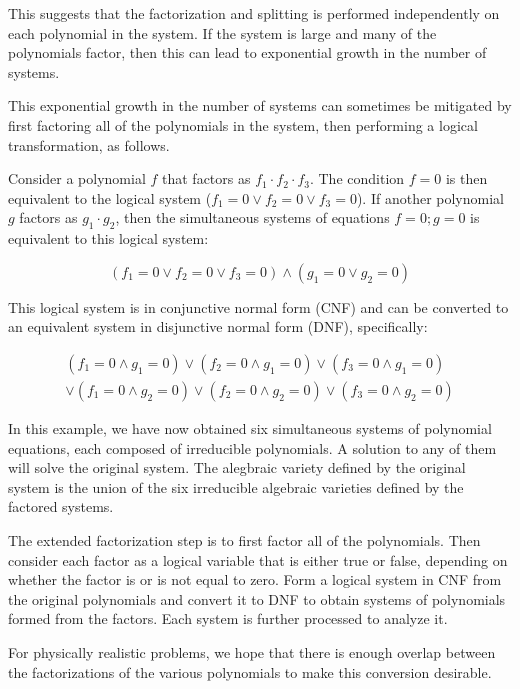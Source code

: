 \documentclass{article}
\begin{document}
This suggests that the factorization and splitting is performed independently on each
polynomial in the system.  If the system is large and many of the polynomials factor,
then this can lead to exponential growth in the number of systems.

This exponential growth in the number of systems can sometimes be mitigated
by first factoring all of the polynomials in the system, then performing
a logical transformation, as follows.

Consider a polynomial $f$ that factors as $f_1\cdot f_2\cdot f_3$.
The condition $f=0$ is then equivalent to the logical system ($f_1=0 \vee f_2=0 \vee f_3=0$).
If another polynomial $g$ factors as $g_1 \cdot g_2$, then the simultaneous
systems of equations $f=0; g=0$ is equivalent to this logical system:

\begin{equation}
(f_1=0 \vee f_2=0 \vee f_3=0) \wedge (g_1 = 0 \vee g_2 = 0)
\end{equation}

This logical system is in conjunctive normal form (CNF) and can be
converted to an equivalent system in disjunctive normal form (DNF), specifically:

\begin{equation}
\begin{split}
(f_1=0 \wedge g_1 = 0) \vee (f_2=0 \wedge g_1 = 0) \vee (f_3=0 \wedge g_1 = 0) \\
\vee (f_1=0 \wedge g_2 = 0) \vee (f_2=0 \wedge g_2 = 0) \vee (f_3=0 \wedge g_2 = 0)
\end{split}
\end{equation}

In this example, we have now obtained six simultaneous systems of polynomial equations,
each composed of irreducible polynomials.  A solution to any of them will solve the
original system.  The alegbraic variety defined by the original system is the union
of the six irreducible algebraic varieties defined by the factored systems.

The extended factorization step is to first factor all of the polynomials.  Then consider
each factor as a logical variable that is either true or false, depending on
whether the factor is or is not equal to zero.  Form a logical system in CNF
from the original polynomials and convert it to DNF to obtain systems of polynomials
formed from the factors.  Each system is further processed to analyze it.

For physically realistic problems, we hope that there is enough overlap between
the factorizations of the various polynomials to make this conversion desirable.
\end{document}
